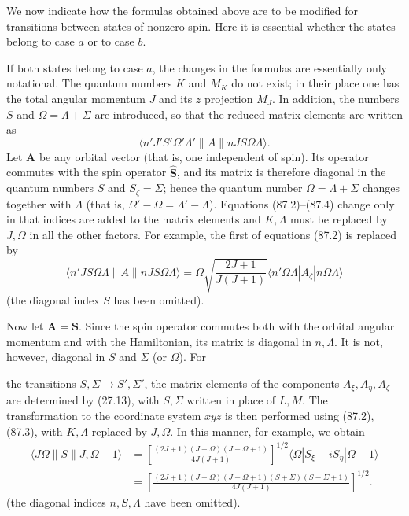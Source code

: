 We now indicate how the formulas obtained above are to be modified for transitions between states of nonzero spin. Here it is essential whether the states belong to case $a$ or to case $b$.

If both states belong to case $a$, the changes in the formulas are essentially only notational. The quantum numbers $K$ and $M_K$ do not exist; in their place one has the total angular momentum $J$ and its $z$ projection $M_J$. In addition, the numbers $S$ and $\Omega=\Lambda+\Sigma$ are introduced, so that the reduced matrix elements are written as
\[
\langle n'J'S'\Omega'\Lambda'\|A\|nJS\Omega\Lambda\rangle.
\]
Let $\mathbf A$ be any orbital vector (that is, one independent of spin). Its operator commutes with the spin operator $\widehat{\mathbf S}$, and its matrix is therefore diagonal in the quantum numbers $S$ and $S_\zeta=\Sigma$; hence the quantum number $\Omega=\Lambda+\Sigma$ changes together with $\Lambda$ (that is, $\Omega'-\Omega=\Lambda'-\Lambda$). Equations (87.2)--(87.4) change only in that indices are added to the matrix elements and $K,\Lambda$ must be replaced by $J,\Omega$ in all the other factors. For example, the first of equations (87.2) is replaced by
\[
\langle n'JS\Omega\Lambda\|A\|nJS\Omega\Lambda\rangle
=\Omega\sqrt{\frac{2J+1}{J(J+1)}}\langle n'\Omega\Lambda|A_\zeta|n\Omega\Lambda\rangle
\]
(the diagonal index $S$ has been omitted).

Now let $\mathbf A=\mathbf S$. Since the spin operator commutes both with the orbital angular momentum and with the Hamiltonian, its matrix is diagonal in $n,\Lambda$. It is not, however, diagonal in $S$ and $\Sigma$ (or $\Omega$). For

the transitions $S,\Sigma\to S',\Sigma'$, the matrix elements of the components $A_\xi,A_\eta,A_\zeta$ are determined by (27.13), with $S,\Sigma$ written in place of $L,M$. The transformation to the coordinate system $xyz$ is then performed using (87.2), (87.3), with $K,\Lambda$ replaced by $J,\Omega$. In this manner, for example, we obtain
\begin{equation}
\begin{split}
\langle J\Omega\|S\|J,\Omega-1\rangle
&=\left[\frac{(2J+1)(J+\Omega)(J-\Omega+1)}{4J(J+1)}\right]^{1/2}
\langle\Omega|S_\xi+iS_\eta|\Omega-1\rangle\\
&=\left[\frac{(2J+1)(J+\Omega)(J-\Omega+1)(S+\Sigma)(S-\Sigma+1)}{4J(J+1)}\right]^{1/2}.
\end{split}
\tag{87.5}
\end{equation}
(the diagonal indices $n,S,\Lambda$ have been omitted).

